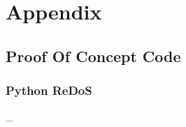 \documentclass{IEEEtran}
\newcommand\pythonstyle{
        \lstset{style=python}
    }
\newcommand\pythonexternal[2][]{{
        \pythonstyle
        }}
\begin{document}
    \newpage

    \printbibliography

    \newpage
    \onecolumn

    \appendix
    \section{Appendix}
        \subsection{Proof Of Concept Code}
            \subsubsection{Python ReDoS}
            \label{sec:PyReDoS}
            \_
            \medskip
                \pythonexternal{Resources/regex.py}

    
\end{document}
